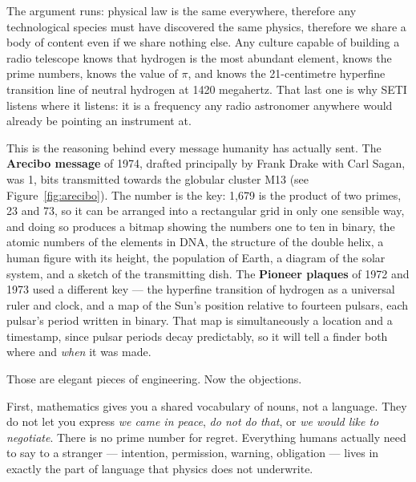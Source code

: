 The argument runs: physical law is the same everywhere, therefore any technological species must have
discovered the same physics, therefore we share a body of content even if we share nothing else. Any
culture capable of building a radio telescope knows that hydrogen is the most abundant element, knows
the prime numbers, knows the value of $\pi$, and knows the 21-centimetre hyperfine transition line of
neutral hydrogen at 1420 megahertz. That last one is why SETI listens where it listens: it is a
frequency any radio astronomer anywhere would already be pointing an instrument at.

This is the reasoning behind every message humanity has actually sent. The \textbf{Arecibo message}
of 1974, drafted principally by Frank Drake with Carl Sagan, was 1, bits transmitted towards the globular cluster M13 (see Figure~\ref{fig:arecibo}). The number is the key: 1,679 is the product of two primes, 23 and 73, so it can
be arranged into a rectangular grid in only one sensible way, and doing so produces a bitmap showing
the numbers one to ten in binary, the atomic numbers of the elements in DNA, the structure of the
double helix, a human figure with its height, the population of Earth, a diagram of the solar system,
and a sketch of the transmitting dish. The \textbf{Pioneer plaques} of 1972 and 1973 used a different
key --- the hyperfine transition of hydrogen as a universal ruler and clock, and a map of the Sun's
position relative to fourteen pulsars, each pulsar's period written in binary. That map is
simultaneously a location and a timestamp, since pulsar periods decay predictably, so it will tell a
finder both where and \emph{when} it was made.


Those are elegant pieces of engineering. Now the objections.

First, mathematics gives you a shared vocabulary of nouns, not a language.  They do not let you express \emph{we came in peace},
\emph{do not do that}, or \emph{we would like to negotiate}. There is no prime number for regret.
Everything humans actually need to say to a stranger --- intention, permission, warning, obligation
--- lives in exactly the part of language that physics does not underwrite.

